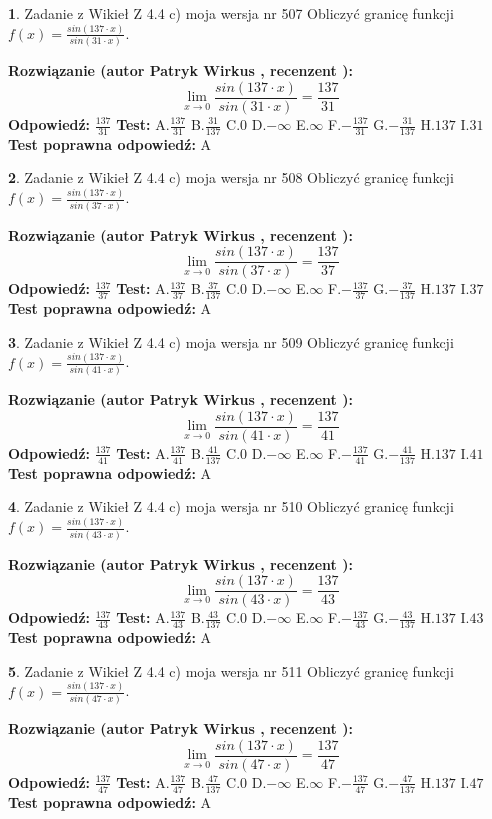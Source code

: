 \documentclass[12pt, a4paper]{article}
\theoremstyle{definition} %
\newtheorem{zad}{}
\newcommand{\zadStart}[1]{\begin{zad}#1\newline}
\newcommand{\zadStop}{\end{zad}}
\newcommand{\rozwStart}[2]{\noindent \textbf{Rozwiązanie (autor #1 , recenzent #2): }\newline}
\newcommand{\rozwStop}{\newline}
\newcommand{\odpStart}{\noindent \textbf{Odpowiedź:}\newline}
\newcommand{\odpStop}{\newline}
\newcommand{\testStart}{\noindent \textbf{Test:}\newline}
\newcommand{\testStop}{\newline}
\newcommand{\kluczStart}{\noindent \textbf{Test poprawna odpowiedź:}\newline}
\newcommand{\kluczStop}{\newline}
\begin{document}
\zadStart{Zadanie z Wikieł Z 4.4 c) moja wersja nr 507}
Obliczyć granicę funkcji $f(x)=\frac{sin(137\cdot x)}{sin(31\cdot x)}$.
\zadStop
\rozwStart{Patryk Wirkus}{}
$$\lim\limits_{x\to 0}\frac{sin(137\cdot x)}{sin(31\cdot x)}=
\frac{137}{31}$$
\rozwStop
\odpStart
$\frac{137}{31}$
\odpStop
\testStart
A.$\frac{137}{31}$
B.$\frac{31}{137}$
C.$0$
D.$-\infty$
E.$\infty$
F.$-\frac{137}{31}$
G.$-\frac{31}{137}$
H.$137$
I.$31$
\testStop
\kluczStart
A
\kluczStop



\zadStart{Zadanie z Wikieł Z 4.4 c) moja wersja nr 508}
Obliczyć granicę funkcji $f(x)=\frac{sin(137\cdot x)}{sin(37\cdot x)}$.
\zadStop
\rozwStart{Patryk Wirkus}{}
$$\lim\limits_{x\to 0}\frac{sin(137\cdot x)}{sin(37\cdot x)}=
\frac{137}{37}$$
\rozwStop
\odpStart
$\frac{137}{37}$
\odpStop
\testStart
A.$\frac{137}{37}$
B.$\frac{37}{137}$
C.$0$
D.$-\infty$
E.$\infty$
F.$-\frac{137}{37}$
G.$-\frac{37}{137}$
H.$137$
I.$37$
\testStop
\kluczStart
A
\kluczStop



\zadStart{Zadanie z Wikieł Z 4.4 c) moja wersja nr 509}
Obliczyć granicę funkcji $f(x)=\frac{sin(137\cdot x)}{sin(41\cdot x)}$.
\zadStop
\rozwStart{Patryk Wirkus}{}
$$\lim\limits_{x\to 0}\frac{sin(137\cdot x)}{sin(41\cdot x)}=
\frac{137}{41}$$
\rozwStop
\odpStart
$\frac{137}{41}$
\odpStop
\testStart
A.$\frac{137}{41}$
B.$\frac{41}{137}$
C.$0$
D.$-\infty$
E.$\infty$
F.$-\frac{137}{41}$
G.$-\frac{41}{137}$
H.$137$
I.$41$
\testStop
\kluczStart
A
\kluczStop



\zadStart{Zadanie z Wikieł Z 4.4 c) moja wersja nr 510}
Obliczyć granicę funkcji $f(x)=\frac{sin(137\cdot x)}{sin(43\cdot x)}$.
\zadStop
\rozwStart{Patryk Wirkus}{}
$$\lim\limits_{x\to 0}\frac{sin(137\cdot x)}{sin(43\cdot x)}=
\frac{137}{43}$$
\rozwStop
\odpStart
$\frac{137}{43}$
\odpStop
\testStart
A.$\frac{137}{43}$
B.$\frac{43}{137}$
C.$0$
D.$-\infty$
E.$\infty$
F.$-\frac{137}{43}$
G.$-\frac{43}{137}$
H.$137$
I.$43$
\testStop
\kluczStart
A
\kluczStop



\zadStart{Zadanie z Wikieł Z 4.4 c) moja wersja nr 511}
Obliczyć granicę funkcji $f(x)=\frac{sin(137\cdot x)}{sin(47\cdot x)}$.
\zadStop
\rozwStart{Patryk Wirkus}{}
$$\lim\limits_{x\to 0}\frac{sin(137\cdot x)}{sin(47\cdot x)}=
\frac{137}{47}$$
\rozwStop
\odpStart
$\frac{137}{47}$
\odpStop
\testStart
A.$\frac{137}{47}$
B.$\frac{47}{137}$
C.$0$
D.$-\infty$
E.$\infty$
F.$-\frac{137}{47}$
G.$-\frac{47}{137}$
H.$137$
I.$47$
\testStop
\kluczStart
A
\kluczStop
\end{document}
